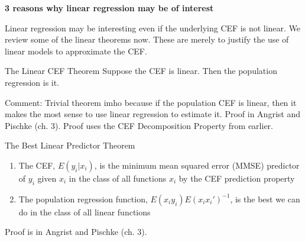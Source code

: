\documentclass[notes=show]{beamer}
\begin{document}
	





\begin{frame}[plain]
	\begin{center}
	\textbf{3 reasons why linear regression may be of interest}
	\end{center}
	
Linear regression may be interesting even if the underlying CEF is not linear.  We review some of the linear theorems now.  These are merely to justify the use of linear models to approximate the CEF.

\end{frame}

\begin{frame}[plain]
	
	\begin{block}{The Linear CEF Theorem}
	Suppose the CEF is linear. Then the population regression is it.
	
	\bigskip
	
	\end{block}
	
	Comment: Trivial theorem imho because if the population CEF is linear, then it makes the most sense to use linear regression to estimate it.  Proof in Angrist and Pischke (ch. 3).  Proof uses the CEF Decomposition Property from earlier.
	
\end{frame}


\begin{frame}[plain]

	\begin{block}{The Best Linear Predictor Theorem}
	\begin{enumerate}
		\item The CEF, $E(y_i | x_i)$, is the minimum mean squared error (MMSE) predictor of $y_i$ given $x_i$ in the class of all functions $x_i$ by the CEF prediction property
		\item The population regression function, $E(x_iy_i)E(x_ix_i')^{-1}$, is the best we can do in the class of all linear functions
	\end{enumerate}
	\end{block}

Proof is in Angrist and Pischke (ch. 3).  	
	
\end{frame}
\end{document}
